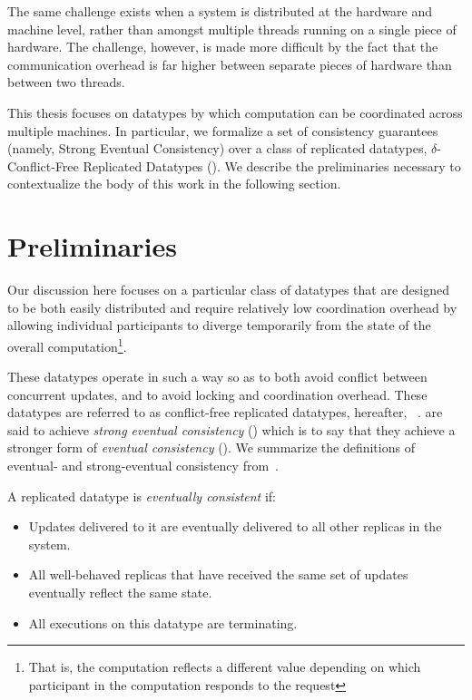 The same challenge exists when a system is distributed at the hardware and
machine level, rather than amongst multiple threads running on a single piece of
hardware. The challenge, however, is made more difficult by the fact that the
communication overhead is far higher between separate pieces of hardware than
between two threads.

This thesis focuses on datatypes by which computation can be coordinated across
multiple machines. In particular, we formalize a set of consistency guarantees
(namely, Strong Eventual Consistency) over a class of replicated datatypes,
$\delta$-Conflict-Free Replicated Datatypes (\CRDTs). We describe the
preliminaries necessary to contextualize the body of this work in the following
section.

\section{Preliminaries}
Our discussion here focuses on a particular class of datatypes that are designed
to be both easily distributed and require relatively low coordination overhead
by allowing individual participants to diverge temporarily from the state of the
overall computation\footnote{That is, the computation reflects a different
value depending on which participant in the computation responds to the
request}.

These datatypes operate in such a way so as to both avoid conflict between
concurrent updates, and to avoid locking and coordination overhead. These
datatypes are referred to as conflict-free replicated datatypes, hereafter,
\CRDTs~\citep{shapiro11}. \CRDTs are said to achieve \textit{strong eventual
consistency} (\SEC) which is to say that they achieve a stronger form of
\textit{eventual consistency} (\EC). We summarize the definitions of eventual-
and strong-eventual consistency from~\cite{shapiro11}.

\begin{definition}
  \label{def:eventual-consistency}
  A replicated datatype is \textit{eventually consistent} if:
  \begin{itemize}
    \item Updates delivered to it are eventually delivered to all other replicas
      in the system.
    \item All well-behaved replicas that have received the same set of updates
      eventually reflect the same state.
    \item All executions on this datatype are terminating.
  \end{itemize}
\end{definition}

